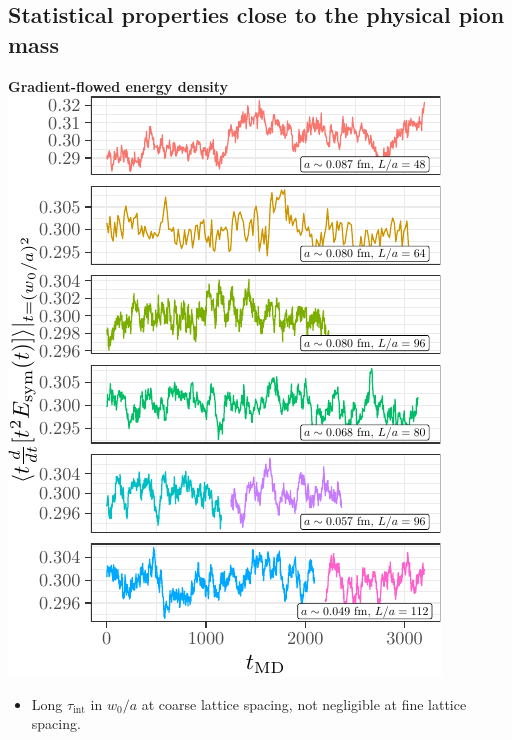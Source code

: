 \documentclass[a0,portrait]{a0poster}
\begin{document}
\begin{multicols}{2}
    \subsection*{Statistical properties close to the physical pion mass}
    \begin{minipage}{0.48\linewidth}
        \centering
        \textbf{\hspace{3cm}Gradient-flowed energy density}\\
        \includegraphics[width=\linewidth,page=1]{data/gf_observables/gf_observables_md_histories}
        \begin{itemize}
            \item Long $\tau_\mathrm{int}$ in $w_0/a$ at coarse lattice spacing, not negligible at fine lattice spacing.
        \end{itemize}
    \end{minipage}
    \hfill
    \begin{minipage}{0.48\linewidth}

\end{minipage}
\end{multicols}
\end{document}
